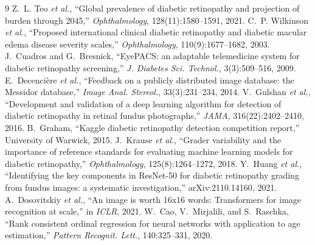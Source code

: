 \documentclass[10pt]{article}
\begin{document}
\footnotesize
\begin{thebibliography}{9}\setlength{\itemsep}{0pt}
 Z.~L. Teo \emph{et al.}, ``Global prevalence of diabetic retinopathy and projection of burden through 2045,'' \emph{Ophthalmology}, 128(11):1580--1591, 2021.
 C.~P. Wilkinson \emph{et al.}, ``Proposed international clinical diabetic retinopathy and diabetic macular edema disease severity scales,'' \emph{Ophthalmology}, 110(9):1677--1682, 2003.
 J.~Cuadros and G.~Bresnick, ``EyePACS: an adaptable telemedicine system for diabetic retinopathy screening,'' \emph{J. Diabetes Sci. Technol.}, 3(3):509--516, 2009.
 E.~Decenci\`ere \emph{et al.}, ``Feedback on a publicly distributed image database: the Messidor database,'' \emph{Image Anal. Stereol.}, 33(3):231--234, 2014.
 V.~Gulshan \emph{et al.}, ``Development and validation of a deep learning algorithm for detection of diabetic retinopathy in retinal fundus photographs,'' \emph{JAMA}, 316(22):2402--2410, 2016.
 B.~Graham, ``Kaggle diabetic retinopathy detection competition report,'' University of Warwick, 2015.
 J.~Krause \emph{et al.}, ``Grader variability and the importance of reference standards for evaluating machine learning models for diabetic retinopathy,'' \emph{Ophthalmology}, 125(8):1264--1272, 2018.
 Y.~Huang \emph{et al.}, ``Identifying the key components in ResNet-50 for diabetic retinopathy grading from fundus images: a systematic investigation,'' arXiv:2110.14160, 2021.
 A.~Dosovitskiy \emph{et al.}, ``An image is worth 16x16 words: Transformers for image recognition at scale,'' in \emph{ICLR}, 2021.
 W.~Cao, V.~Mirjalili, and S.~Raschka, ``Rank consistent ordinal regression for neural networks with application to age estimation,'' \emph{Pattern Recognit. Lett.}, 140:325--331, 2020.
\end{thebibliography}
\end{document}
